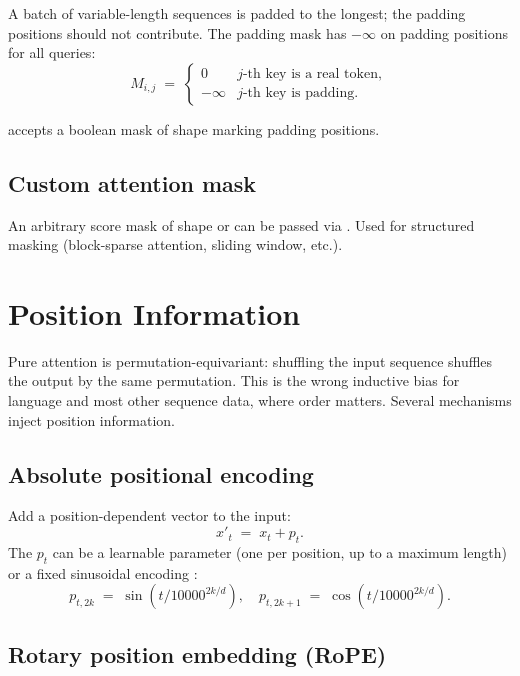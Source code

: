 A batch of variable-length sequences is padded to the longest;
the padding positions should not contribute. The padding mask
has $-\infty$ on padding positions for all queries:
\[
M_{i, j} \;=\; \begin{cases}
0 & j\text{-th key is a real token}, \\
-\infty & j\text{-th key is padding}.
\end{cases}
\]

 accepts
a boolean mask of shape  marking padding
positions.

\subsection{Custom attention mask}
\label{ssec:attention:custom_mask}

An arbitrary score mask of shape  or
 can be passed via . Used
for structured masking (block-sparse attention, sliding window,
etc.).

\section{Position Information}
\label{sec:attention:position}

Pure attention is permutation-equivariant: shuffling the input
sequence shuffles the output by the same permutation. This is the
wrong inductive bias for language and most other sequence data,
where order matters. Several mechanisms inject position
information.

\subsection{Absolute positional encoding}
\label{ssec:attention:abs_pos}

Add a position-dependent vector to the input:
\[
x'_t \;=\; x_t + p_t.
\]
The $p_t$ can be a learnable parameter (one per position, up to a
maximum length) or a fixed sinusoidal encoding
\cite{vaswani_attention_2017}:
\[
p_{t, 2k} \;=\; \sin(t / 10000^{2k/d}), \quad
p_{t, 2k+1} \;=\; \cos(t / 10000^{2k/d}).
\]

\subsection{Rotary position embedding (RoPE)}
\label{ssec:attention:rope}

